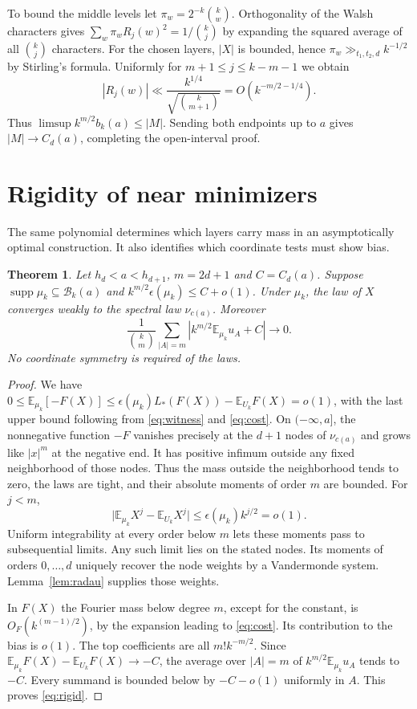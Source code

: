 \documentclass[11pt,letterpaper]{article}
\theoremstyle{research}
\newtheorem{theorem}{Theorem}\newtheorem{lemma}[theorem]{Lemma}
\newcommand{\E}{\mathbb E}\newcommand{\R}{\mathbb R}\newcommand{\N}{\mathbb N}
\newcommand{\U}{U_k}\newcommand{\He}{H}
\newcommand{\low}{\mathcal B_k(a)}\newcommand{\high}{\mathcal D_k(a)}
\newcommand{\sect}[1]{\section{\texorpdfstring{\color{ink}#1}{#1}}}
\begin{document}
To bound the middle levels let $\pi_w=2^{-k}\binom{k}{w}$. Orthogonality
of the Walsh characters gives
$\sum_w\pi_w R_j(w)^2=1/\binom{k}{j}$ by expanding the squared average of
all $\binom{k}{j}$ characters. For the chosen layers, $|X|$ is bounded,
hence $\pi_w\gg_{t_1,t_2,d}k^{-1/2}$ by Stirling's formula. Uniformly for
$m+1\le j\le k-m-1$ we obtain
\[
 |R_j(w)|\ll \frac{k^{1/4}}{\sqrt{\binom{k}{m+1}}}
                =O(k^{-m/2-1/4}).
\]
Thus $\limsup k^{m/2}b_k(a)\le |M|$. Sending both endpoints up to $a$
gives $|M|\to C_d(a)$, completing the open-interval proof.
\clearpage
\sect{Rigidity of near minimizers}
The same polynomial determines which layers carry mass in an asymptotically
optimal construction. It also identifies which coordinate tests must show bias.
\begin{theorem}\label{th:rigid}
Let $h_d<a<h_{d+1}$, $m=2d+1$ and $C=C_d(a)$. Suppose
$\operatorname{supp}\mu_k\subseteq\low$ and
$k^{m/2}\epsilon(\mu_k)\le C+o(1)$. Under $\mu_k$, the law of $X$ converges
weakly to the spectral law $\nu_{c(a)}$. Moreover
\begin{equation}\label{eq:rigid}
 \frac1{\binom{k}{m}}\sum_{|A|=m}
  \left|k^{m/2}\E_{\mu_k}u_A+C\right|\longrightarrow0.
\end{equation}
No coordinate symmetry is required of the laws.
\end{theorem}
\begin{proof}
We have $0\le\E_{\mu_k}[-F(X)]\le
\epsilon(\mu_k)L_*(F(X))-\E_{\U}F(X)=o(1)$, with the last upper
bound following from \eqref{eq:witness} and \eqref{eq:cost}.
On $(-\infty,a]$, the nonnegative function $-F$ vanishes precisely at the
$d+1$ nodes of $\nu_{c(a)}$ and grows like $|x|^m$ at the negative end.
It has positive infimum outside any fixed neighborhood of those nodes.
Thus the mass outside the neighborhood tends to zero, the laws are tight,
and their absolute moments of order $m$ are bounded. For $j<m$,
\[
 \bigl|\E_{\mu_k}X^j-\E_{\U}X^j\bigr|
 \le \epsilon(\mu_k)k^{j/2}=o(1).
\]
Uniform integrability at every order below $m$ lets these moments pass
to subsequential limits. Any such limit lies on the stated nodes. Its
moments of orders $0,\ldots,d$ uniquely recover the node weights by a
Vandermonde system. Lemma~\ref{lem:radau} supplies those weights.

In $F(X)$ the Fourier mass below degree $m$, except for the constant,
is $O_F(k^{(m-1)/2})$, by the expansion leading to \eqref{eq:cost}.
Its contribution to the bias is $o(1)$. The top coefficients are all
$m! k^{-m/2}$. Since $\E_{\mu_k} F(X)-\E_{\U}F(X)\to-C$, the
average over $|A|=m$ of $k^{m/2}\E_{\mu_k}u_A$ tends to $-C$.
Every summand is bounded below by $-C-o(1)$ uniformly in $A$.
This proves \eqref{eq:rigid}.
\end{proof}
\end{document}
